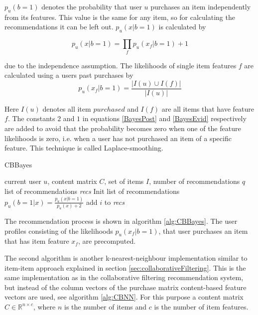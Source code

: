 \documentclass[10pt]{reportMaster}
\begin{document}
$p_u(b=1)$ denotes the probability that user $u$ purchases an item independently from its features.
This value is the same for any item, so for calculating the recommendations it can be left out.
$p_u(x|b=1)$ is calculated by 

\begin{equation}
\label{BayesEvid}
p_u(x|b=1) = \prod_f{p_u(x_f|b=1)+1}
\end{equation}

due to the independence assumption.
The likelihoods of single item features $f$ are calculated using a users past purchases by
\begin{equation}
p_u(x_f|b=1) = \frac{|I(u) \cup I(f)|}{|I(u)|}
\end{equation}

Here $I(u)$ denotes all item $purchased$ and $I(f)$ are all items that have feature $f$.
The constants $2$ and $1$ in equations \ref{BayesPost} and \ref{BayesEvid} respectively are added to avoid that the probability becomes zero when one of the feature likelihoods is zero, i.e. when a user has not purchased an item of a specific feature.
This technique is called Laplace-smoothing.

\begin{algorithm}
	\caption{CBBayes}
	\label{alg:CBBayes}
	\begin{algorithmic}[1]
		\Require current user $u$, content matrix $C$, set of items $I$, number of recommendations $q$
		\Ensure list of recommendations \textit{recs}
		\State Init list of recommendations 
			\State 	$p_u(b=1|x) = \frac{p_u(x|b=1)}{p_u(x)+2}$
				\State add $i$ to \textit{recs}
			\EndIf
		\EndFor
	\end{algorithmic}	
\end{algorithm}

The recommendation process is shown in algorithm \ref{alg:CBBayes}.
The user profiles consisting of the likelihoods $p_u(x_f|b=1)$, that user purchases an item that has item feature $x_f$, are precomputed.

The second algorithm is another k-nearest-neighbour implementation similar to item-item approach explained in section \ref{sec:collaborativeFiltering}.
This is the same implementation as in the collaborative filtering recommendation system, but instead of the column vectors of the purchase matrix content-based feature vectors are used, see algorithm \ref{alg:CBNN}.
For this purpose a content matrix $C \in \mathds{R}^{n \times c}$, where $n$ is the number of items and $c$ is the number of item features.
\end{document}
